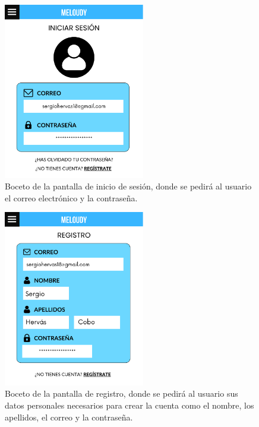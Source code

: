 \begin{figure}[H]
    \centering
    \centerline{\includegraphics[width=0.55\textwidth, frame]{imagenes/c6/9.png}}
    \caption{Boceto de la pantalla de inicio de sesión, donde se pedirá al usuario el correo electrónico y la contraseña.}
    \label{fig:login}
\end{figure}


\begin{figure}[H]
    \centering
    \centerline{\includegraphics[width=0.55\textwidth, frame]{imagenes/c6/10.png}}
    \caption{Boceto de la pantalla de registro, donde se pedirá al usuario sus datos personales necesarios para crear la cuenta como el nombre, los apellidos, el correo y la contraseña.}
    \label{fig:registro}
\end{figure}


